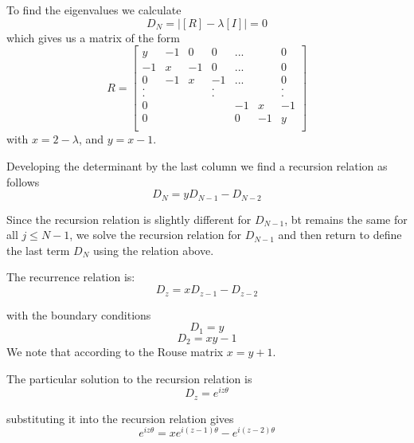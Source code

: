 \documentclass{report}
\begin{document}
To find the eigenvalues we calculate 
\begin{equation*}
D_N=\left|[R]-\lambda[I]\right|=0
\end{equation*}
which gives us a matrix of the form 
\begin{equation*}
R=\left[
\begin{matrix}
 y & -1 &  0 &  0 &...&  &  0 \\
-1 &  x & -1 &  0 &...&  &  0 \\
 0 & -1 &  x & -1 &...&  &  0 \\
 . &    &    &  . &   &  &  . \\
 . &    &    &  . &   &  &  . \\
 0 &    &    &    & -1& x& -1 \\
 0 &    &    &    &  0&-1&  y \\     
\end{matrix}
\right]
\end{equation*}
with $x=2-\lambda$, and $y=x-1$.

Developing the determinant by the last column we find a recursion relation as follows 
\begin{equation*}
D_N = yD_{N-1}-D_{N-2}
\end{equation*}

Since the recursion relation is slightly different for $D_{N-1}$, bt remains the same for all $j\leq N-1$, we solve the recursion relation for $D_{N-1}$ and then return to define the last term $D_N$ using the relation above. 

The recurrence relation is:
\begin{equation*}
D_z = xD_{z-1}-D_{z-2}
\end{equation*}

with the boundary conditions
\begin{equation*}
D_1 = y 
\end{equation*}
\begin{equation*}
D_2 = xy-1
\end{equation*}
We note that according to the Rouse matrix $x=y+1$.

The particular solution to the recursion relation is 
\begin{equation*}
D_z=e^{iz\theta}
\end{equation*}

substituting it into the recursion relation gives
\begin{equation*}
e^{iz\theta}=xe^{i(z-1)\theta}-e^{i(z-2)\theta}
\end{equation*}
\end{document}
